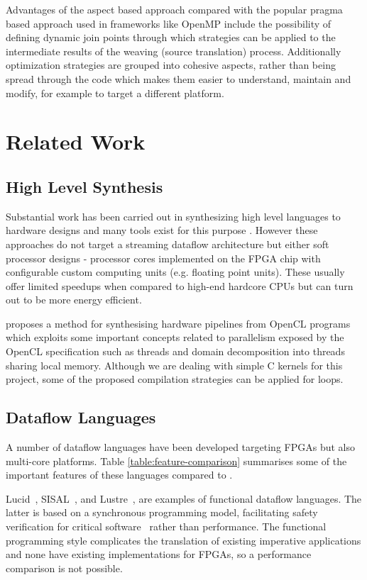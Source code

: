 Advantages of the aspect based approach compared with the popular
pragma based approach used in frameworks like
OpenMP \cite{Ferrer:Judit:Bellens:Duran:Gonzalez:Marorell:Badia:Ayquade:Labarta:2011}
include the possibility of defining dynamic join points through which
strategies can be applied to the intermediate results of the weaving
(source translation) process. Additionally optimization strategies are
grouped into cohesive aspects, rather than being spread through the
code which makes them easier to understand, maintain and modify, for
example to target a different platform.


\section{Related Work}

\subsection{High Level Synthesis}

Substantial work has been carried out in synthesizing high level
languages to hardware designs and many tools exist for this purpose
\cite{CtoVerilog, Vivado, ImpulseC}. However these approaches
do not target a streaming dataflow architecture but either soft
processor designs - processor cores implemented on the FPGA chip with
configurable custom computing units (e.g. floating point units). These
usually offer limited speedups when compared to high-end hardcore
CPUs but can turn out to be more energy efficient.

\cite{Czerniawski} proposes a method for synthesising hardware
pipelines from OpenCL programs which exploits some important concepts
related to parallelism exposed by the OpenCL specification
\cite{OpenCL} such as threads and domain decomposition into threads
sharing local memory. Although we are dealing with simple C kernels
for this project, some of the proposed compilation strategies can be
applied for loops.

\subsection{Dataflow Languages}
A number of dataflow languages have been developed targeting FPGAs but
also multi-core platforms. Table \ref{table:feature-comparison}
summarises some of the important features of these languages compared
to \FAST{}.

Lucid~\cite{ashcroft1977lucid},
SISAL~\cite{gurd1987implicit,mcgraw1983sisal}, and
Lustre~\cite{halbwachs1991synchronous}, are examples of functional
dataflow languages. The latter is based on a synchronous programming
model, facilitating safety verification for critical
software~\cite{halbwachs1992programming} rather than performance. The
functional programming style complicates the translation of existing
imperative applications and none have existing implementations for
FPGAs, so a performance comparison is not possible.

